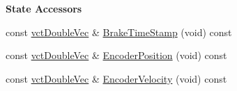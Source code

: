 \begin{Indent}{\bf State Accessors}
\begin{DoxyCompactItemize}
\item 
const \hyperlink{vct_dynamic_vector_types_8h_ade4b3068c86fb88f41af2e5187e491c2}{vct\+Double\+Vec} \& \hyperlink{classsaw_robot_i_o1394_1_1osa_robot1394_a768874a0b4053acb1444a879fa906b72}{Brake\+Time\+Stamp} (void) const 
\item 
const \hyperlink{vct_dynamic_vector_types_8h_ade4b3068c86fb88f41af2e5187e491c2}{vct\+Double\+Vec} \& \hyperlink{classsaw_robot_i_o1394_1_1osa_robot1394_a48592681f5ecec1241d2c49e6be891ad}{Encoder\+Position} (void) const 
\item 
const \hyperlink{vct_dynamic_vector_types_8h_ade4b3068c86fb88f41af2e5187e491c2}{vct\+Double\+Vec} \& \hyperlink{classsaw_robot_i_o1394_1_1osa_robot1394_ad48ab1de52591c73afa9ec0bdc9beac4}{Encoder\+Velocity} (void) const 
\end{DoxyCompactItemize}
\end{Indent}

